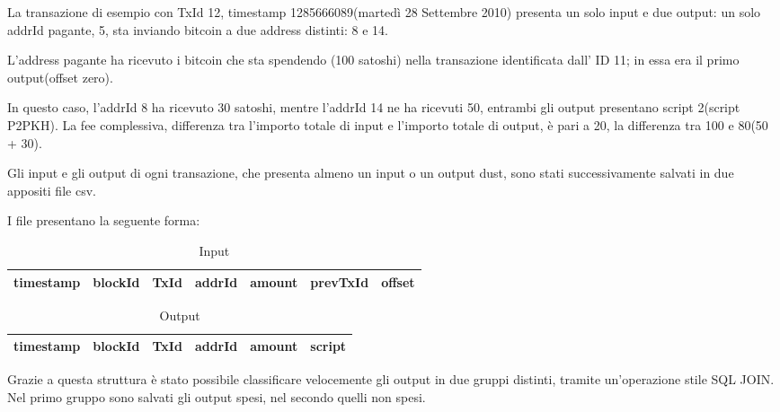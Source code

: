 La transazione di esempio con TxId 12, timestamp 1285666089(martedì 28 Settembre 2010) presenta un solo input e due output: un solo addrId pagante, 5, sta inviando bitcoin a due address distinti: 8 e 14.

L’address pagante
ha ricevuto i bitcoin che sta spendendo (100 satoshi) nella transazione identificata dall' ID 11; in essa era il primo output(offset zero). 

In questo caso, l’addrId 8 ha ricevuto 30 satoshi, mentre l’addrId 14 ne ha ricevuti 50, entrambi gli output presentano script 2(script P2PKH). La fee complessiva, differenza tra l'importo totale di input e l'importo totale di output, è pari a 20, la differenza tra 100 e 80(50 + 30).

Gli input e gli output di ogni transazione, che presenta almeno un input o un output dust, sono stati successivamente salvati in due appositi file csv.

I file presentano la seguente forma:
\begin{table}[h!]
\centering
\begin{tabular}{|r|r|r|r|r|r|r|}
\toprule
 timestamp &  blockId &   TxId &  addrId &     amount &  prevTxId &  offset \\
\bottomrule
\end{tabular}
\caption{Input}
\label{table: input}
\end{table}

\begin{table}[h!]
\centering
\begin{tabular}{|r|r|r|r|r|r|}
\toprule
 timestamp &  blockId &   TxId &  addrId &     amount &  script \\
\bottomrule
\end{tabular}
\caption{Output}
\label{table: output}
\end{table}
Grazie a questa struttura è stato possibile classificare velocemente gli output in due gruppi distinti, tramite un'operazione stile SQL JOIN. Nel primo gruppo sono salvati gli output spesi, nel secondo quelli non spesi. 

